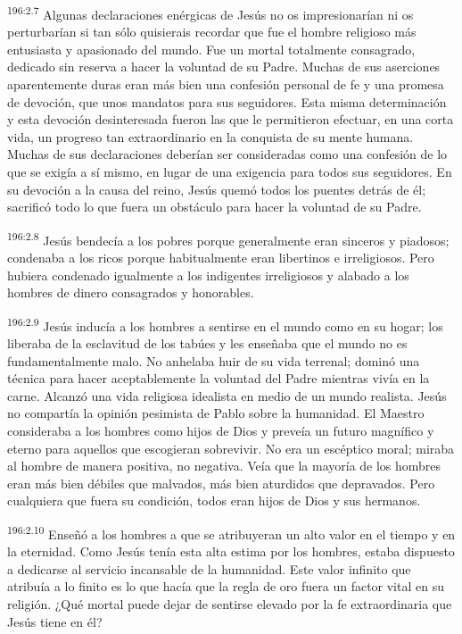 \par 
\textsuperscript{196:2.7} Algunas declaraciones enérgicas de Jesús no os impresionarían ni os perturbarían si tan sólo quisierais recordar que fue el hombre religioso más entusiasta y apasionado del mundo. Fue un mortal totalmente consagrado, dedicado sin reserva a hacer la voluntad de su Padre. Muchas de sus aserciones aparentemente duras eran más bien una confesión personal de fe y una promesa de devoción, que unos mandatos para sus seguidores. Esta misma determinación y esta devoción desinteresada fueron las que le permitieron efectuar, en una corta vida, un progreso tan extraordinario en la conquista de su mente humana. Muchas de sus declaraciones deberían ser consideradas como una confesión de lo que se exigía a sí mismo, en lugar de una exigencia para todos sus seguidores. En su devoción a la causa del reino, Jesús quemó todos los puentes detrás de él; sacrificó todo lo que fuera un obstáculo para hacer la voluntad de su Padre.

\par 
\textsuperscript{196:2.8} Jesús bendecía a los pobres porque generalmente eran sinceros y piadosos; condenaba a los ricos porque habitualmente eran libertinos e irreligiosos. Pero hubiera condenado igualmente a los indigentes irreligiosos y alabado a los hombres de dinero consagrados y honorables.

\par 
\textsuperscript{196:2.9} Jesús inducía a los hombres a sentirse en el mundo como en su hogar; los liberaba de la esclavitud de los tabúes y les enseñaba que el mundo no es fundamentalmente malo. No anhelaba huir de su vida terrenal; dominó una técnica para hacer aceptablemente la voluntad del Padre mientras vivía en la carne. Alcanzó una vida religiosa idealista en medio de un mundo realista. Jesús no compartía la opinión pesimista de Pablo sobre la humanidad. El Maestro consideraba a los hombres como hijos de Dios y preveía un futuro magnífico y eterno para aquellos que escogieran sobrevivir. No era un escéptico moral; miraba al hombre de manera positiva, no negativa. Veía que la mayoría de los hombres eran más bien débiles que malvados, más bien aturdidos que depravados. Pero cualquiera que fuera su condición, todos eran hijos de Dios y sus hermanos.

\par 
\textsuperscript{196:2.10} Enseñó a los hombres a que se atribuyeran un alto valor en el tiempo y en la eternidad. Como Jesús tenía esta alta estima por los hombres, estaba dispuesto a dedicarse al servicio incansable de la humanidad. Este valor infinito que atribuía a lo finito es lo que hacía que la regla de oro fuera un factor vital en su religión. ¿Qué mortal puede dejar de sentirse elevado por la fe extraordinaria que Jesús tiene en él?

